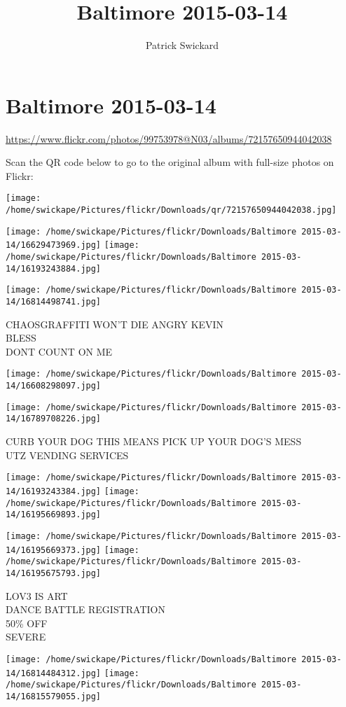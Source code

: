 \documentclass[10pt,letterpaper]{article}
\title{Baltimore 2015-03-14}
\author{Patrick Swickard}
\date{}
\begin{document}
\section*{Baltimore 2015-03-14}

\url{https://www.flickr.com/photos/99753978@N03/albums/72157650944042038}

Scan the QR code below to go to the original album with full-size photos on Flickr:

\texttt{[image: /home/swickape/Pictures/flickr/Downloads/qr/72157650944042038.jpg]}
\pagebreak

\texttt{[image: /home/swickape/Pictures/flickr/Downloads/Baltimore 2015-03-14/16629473969.jpg]}
\texttt{[image: /home/swickape/Pictures/flickr/Downloads/Baltimore 2015-03-14/16193243884.jpg]}

\vspace{0.25in}
\texttt{[image: /home/swickape/Pictures/flickr/Downloads/Baltimore 2015-03-14/16814498741.jpg]}

CHAOSGRAFFITI WON'T DIE ANGRY KEVIN\\
BLESS\\
DONT COUNT ON ME
\pagebreak

\texttt{[image: /home/swickape/Pictures/flickr/Downloads/Baltimore 2015-03-14/16608298097.jpg]}

\vspace{0.25in}
\texttt{[image: /home/swickape/Pictures/flickr/Downloads/Baltimore 2015-03-14/16789708226.jpg]}

CURB YOUR DOG THIS MEANS PICK UP YOUR DOG'S MESS\\
UTZ VENDING SERVICES
\pagebreak

\texttt{[image: /home/swickape/Pictures/flickr/Downloads/Baltimore 2015-03-14/16193243384.jpg]}
\texttt{[image: /home/swickape/Pictures/flickr/Downloads/Baltimore 2015-03-14/16195669893.jpg]}

\texttt{[image: /home/swickape/Pictures/flickr/Downloads/Baltimore 2015-03-14/16195669373.jpg]}
\texttt{[image: /home/swickape/Pictures/flickr/Downloads/Baltimore 2015-03-14/16195675793.jpg]}

LOV3 IS ART\\
DANCE BATTLE REGISTRATION\\
50\% OFF\\
SEVERE
\pagebreak

\texttt{[image: /home/swickape/Pictures/flickr/Downloads/Baltimore 2015-03-14/16814484312.jpg]}
\texttt{[image: /home/swickape/Pictures/flickr/Downloads/Baltimore 2015-03-14/16815579055.jpg]}
\end{document}
